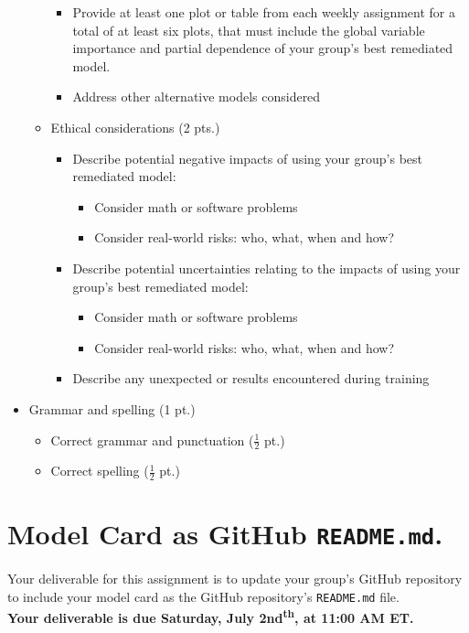 \documentclass[fleqn]{article}
\begin{document}
\begin{itemize}
\begin{itemize}
\begin{itemize}
			\item Provide at least one plot or table from each weekly assignment for a total of at least six plots, that must include the global variable importance and partial dependence of your group's best remediated model.
			\item Address other alternative models considered
		\end{itemize}
		\item Ethical considerations (2 pts.)
		\begin{itemize}
			\item Describe potential negative impacts of using your group's best remediated model: 
			\begin{itemize}
			\item Consider math or software problems
			\item Consider real-world risks: who, what, when and how?
			\end{itemize}
			\item Describe potential uncertainties relating to the impacts of using your group's best remediated model:
			\begin{itemize} 
				\item Consider math or software problems
				\item Consider real-world risks: who, what, when and how?
			\end{itemize}
			\item Describe any unexpected or results encountered during training
		\end{itemize}
	\end{itemize}
	\item Grammar and spelling (1 pt.)
	\begin{itemize} 
		\item Correct grammar and punctuation ($\frac{1}{2}$ pt.)
		\item Correct spelling ($\frac{1}{2}$ pt.)
	\end{itemize}
\end{itemize}


\section{Model Card as GitHub \texttt{README.md}.}

Your deliverable for this assignment is to update your group's GitHub repository to include your model card as the GitHub repository's \texttt{README.md} file.\\

\noindent \textbf{Your deliverable is due Saturday, July 2nd\textsuperscript{th}, at 11:00 AM ET.}\\
\end{document}
